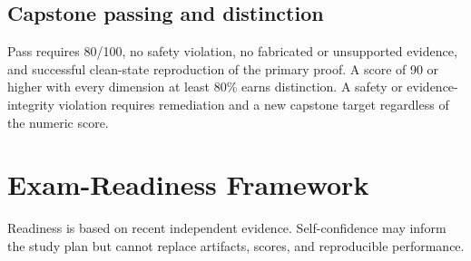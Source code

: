 \documentclass[11pt]{article}
\begin{document}
\subsection{Capstone passing and distinction}
Pass requires 80/100, no safety violation, no fabricated or unsupported evidence,
and successful clean-state reproduction of the primary proof. A score of 90 or
higher with every dimension at least 80\% earns distinction. A safety or evidence-
integrity violation requires remediation and a new capstone target regardless of
the numeric score.

\section{Exam-Readiness Framework}
\label{sec:readiness}

Readiness is based on recent independent evidence. Self-confidence may inform the
study plan but cannot replace artifacts, scores, and reproducible performance.
\end{document}
